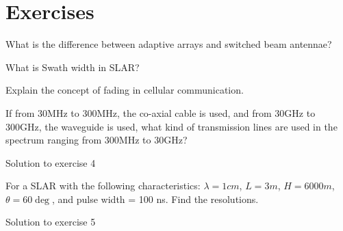 \newpage
\section*{Exercises}
\begin{ExerciseList}
\Exercise[label={ex11}]
What is the difference between adaptive arrays and switched beam antennae?

\Exercise[label={ex12}]
What is Swath width in SLAR?

\Exercise[label={ex13}]
Explain the concept of fading in cellular communication.

\Exercise[label={ex14}]
If from 30MHz to 300MHz, the co-axial cable is used, and from 30GHz to 300GHz, the waveguide is used, what kind of transmission lines are used in the spectrum ranging from 300MHz to 30GHz?

\Answer[ref={ex14}]
Solution to exercise 4

\Exercise[label={ex15}]
For a SLAR with the following characteristics: $\lambda = 1cm$, $L = 3m$, $H = 6000m$,
$\theta = 60\deg$, and pulse width = 100 ns. 
Find the resolutions.

\Answer[ref={ex15}]
Solution to exercise 5
\end{ExerciseList}


